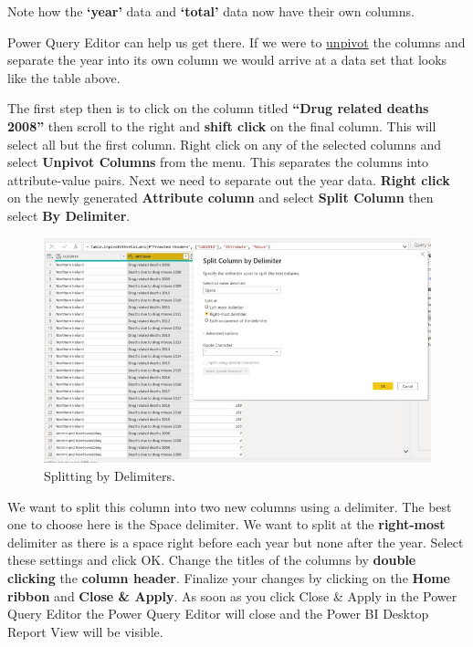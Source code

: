 \documentclass[
]{book}
\begin{document}
Note how the \textbf{`year'} data and \textbf{`total'} data now have their own columns.

Power Query Editor can help us get there. If we were to \href{https://support.microsoft.com/en-us/office/unpivot-columns-power-query-0f7bad4b-9ea1-49c1-9d95-f588221c7098}{unpivot} the columns and separate the year into its own column we would arrive at a data set that looks like the table above.

The first step then is to click on the column titled \textbf{``Drug related deaths 2008''} then scroll to the right and \textbf{shift click} on the final column. This will select all but the first column. Right click on any of the selected columns and select \textbf{Unpivot Columns} from the menu. This separates the columns into attribute-value pairs. Next we need to separate out the year data. \textbf{Right click} on the newly generated \textbf{Attribute column} and select \textbf{Split Column} then select \textbf{By Delimiter}.

\begin{figure}
\centering
\includegraphics{bi4.jpg}
\caption{Splitting by Delimiters.}
\end{figure}

We want to split this column into two new columns using a delimiter. The best one to choose here is the Space delimiter. We want to split at the \textbf{right-most} delimiter as there is a space right before each year but none after the year. Select these settings and click OK. Change the titles of the columns by \textbf{double clicking} the \textbf{column header}. Finalize your changes by clicking on the \textbf{Home ribbon} and \textbf{Close \& Apply}. As soon as you click Close \& Apply in the Power Query Editor the Power Query Editor will close and the Power BI Desktop Report View will be visible.
\end{document}
